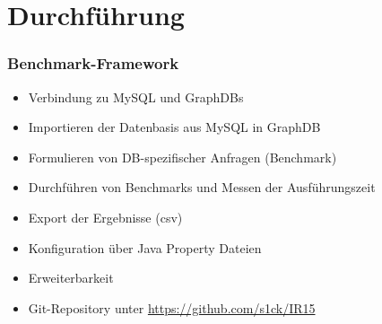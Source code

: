 \documentclass{beamer}
\begin{document}
\section{Durchführung}
\begin{frame}\frametitle{Benchmark-Framework} 
	\begin{itemize}
		\item Verbindung zu MySQL und GraphDBs
		\item Importieren der Datenbasis aus MySQL in GraphDB
		\item Formulieren von DB-spezifischer Anfragen (Benchmark)
		\item Durchführen von Benchmarks und Messen der Ausführungszeit
		\item Export der Ergebnisse (csv)
		\item Konfiguration über Java Property Dateien
		\item Erweiterbarkeit
		\item Git-Repository unter \href{https://github.com/s1ck/IR15}{https://github.com/s1ck/IR15}

	\end{itemize} 
\end{frame}
\end{document}
